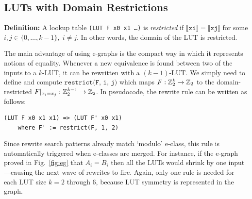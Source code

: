 \subsection{LUTs with Domain Restrictions}\label{sec:rewrites:restrict}

\textbf{Definition:} A lookup table \texttt{(LUT F x0 x1 \ldots)} is
\textit{restricted} if $\llbracket \texttt{xi} \rrbracket = \llbracket \texttt{xj} \rrbracket$
for some $ i, j \in \{0, \ldots, k-1\}, \; i \neq j$. In other words, the
domain of the LUT is restricted.

The main advantage of using e-graphs is the compact way in which it represents
notions of equality. Whenever a new equivalence is found between two of the
inputs to a $k$-LUT, it can be rewritten with a $(k-1)$-LUT. We simply need to
define and compute $\texttt{restrict(F, i, j)}$ which maps $F : \mathbb{Z}_{2}^{k}
    \rightarrow \mathbb{Z}_{2}$ to the domain-restricted $F \vert_{x_i = x_j} : \mathbb{Z}_{2}^{k-1}
    \rightarrow \mathbb{Z}_{2}$. In pseudocode, the rewrite rule can be written as follows:

\begin{lstlisting}
(LUT F x0 x1 x1) => (LUT F' x0 x1)
    where F' := restrict(F, 1, 2)
\end{lstlisting}

Since rewrite search patterns already match `modulo' e-class, this rule is
automatically triggered when e-classes are merged. For instance, if the e-graph
proved in Fig.~\ref{fig:eg} that $A_i = B_i$ then all the LUTs would shrink by
one input---causing the next wave of rewrites to fire. Again, only one rule is
needed for each LUT size $k=2$ through 6, because LUT symmetry is represented
in the graph.

